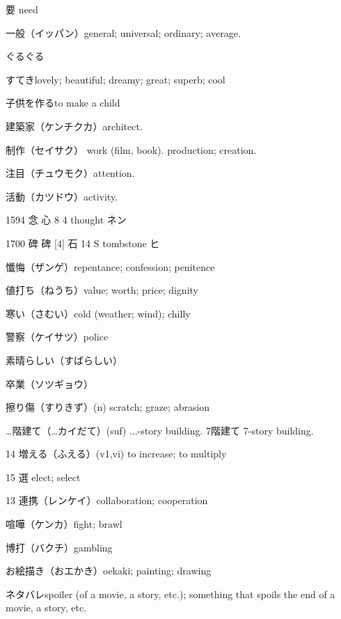 要 need

一般（イッパン）general; universal; ordinary; average.

ぐるぐる

すてきlovely; beautiful; dreamy; great; superb; cool


子供を作るto make a child

建築家（ケンチクカ）architect.

制作（セイサク）
work (film, book).
production; creation.

注目（チュウモク）attention.

活動（カツドウ）activity.

1594	念		心	8	4		thought	ネン

1700	碑	碑 [4]	石	14	S		tombstone	ヒ

懺悔（ザンゲ）repentance; confession; penitence

値打ち（ねうち）value; worth; price; dignity

寒い（さむい）cold (weather; wind); chilly

警察（ケイサツ）police

素晴らしい（すばらしい）

卒業（ソツギョウ）

擦り傷（すりきず）(n) scratch; graze; abrasion

…階建て（…カイだて）(suf) ...-story building.
7階建て 7-story building.

14 増える（ふえる）(v1,vi) to increase; to multiply

15 選 elect; select

13 連携（レンケイ）collaboration; cooperation

喧嘩（ケンカ）fight; brawl

博打（バクチ）gambling

お絵描き（おエかき）oekaki; painting; drawing

ネタバレspoiler (of a movie, a story, etc.); something that spoils the end of a movie, a story, etc.
